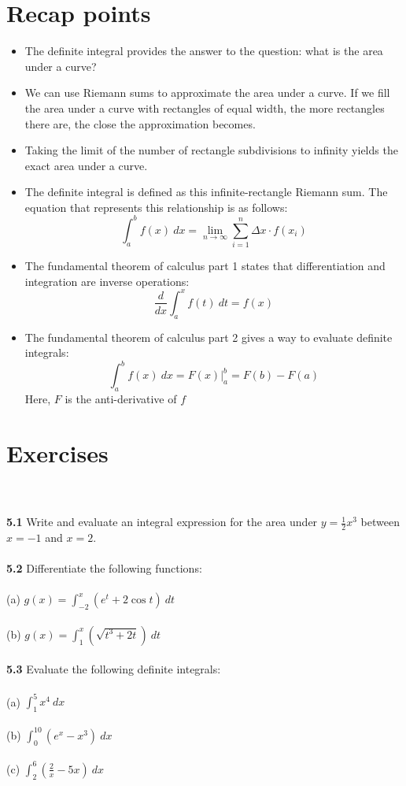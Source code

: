 \documentclass[11pt]{scrartcl}
\begin{document}
\section{Recap points}
\begin{itemize}
    \item The definite integral provides the answer to the question: what is the area under a curve? 
    \item We can use Riemann sums to approximate the area under a curve. If we fill the area under a curve with rectangles of equal width, the more rectangles there are, the close the approximation becomes. 
    \item Taking the limit of the number of rectangle subdivisions to infinity yields the exact area under a curve. 
    \item The definite integral is defined as this infinite-rectangle Riemann sum. The equation that represents this relationship is as follows: 
    $$\int_a^b f(x) \ dx=\lim_{n \to \infty} \sum_{i=1}^{n} \Delta x \cdot f(x_i)$$
    \item The fundamental theorem of calculus part 1 states that differentiation and integration are inverse operations:
    $$\frac{d}{dx}\int_a^x f(t) \ dt=f(x)$$
    \item The fundamental theorem of calculus part 2 gives a way to evaluate definite integrals: 
    $$\int_a^b{f(x)} \ dx=F(x)\biggr\rvert_a^b=F(b)-F(a)$$
    Here, $F$ is the anti-derivative of $f$
\end{itemize}
\section{Exercises}\\
\\
\noindent 
\textbf{5.1} Write and evaluate an integral expression for the area under $y=\frac{1}{2}x^3$ between $x=-1$ and $x=2$. \\
\\
\noindent
\textbf{5.2} Differentiate the following functions: \\
\\
\noindent 
(a) $g(x)=\int_{-2}^x (e^t+2\cos t) \ dt$\\
\\
\noindent 
(b) $g(x)=\int_{1}^x (\sqrt{t^3+2t}) \ dt$ \\
\\
\noindent 
\textbf{5.3} Evaluate the following definite integrals: \\
\\
\noindent 
(a) $\int_{1}^5x^4 \ dx$ \\
\\
\noindent 
(b) $\int_{0}^{10} (e^x-x^3) \ dx$ \\
\\
\noindent 
(c) $\int_{2}^{6} (\frac{2}{x}-5x) \ dx$ \\
\\
\noindent 
\end{document}
